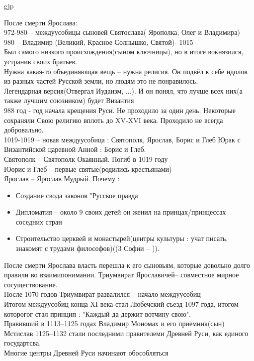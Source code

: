 gjp	 \documentclass[12pt,a4paper]{article}
\begin{document}
После смерти Ярослава:\\
972-980 -- междуусобицы сыновей Святослава( Ярополка, Олег и Владимира)\\
980 -- Владимир (Великий, Красное Солнышко, Святой)- 1015\\
Был самого низкого происхождения(сыном ключницы), но в итоге вокнязился, устранив своих братьев.\\
Нужна какая-то объединяющая вещь -- нужна религия. Он подвёл к себе идолов из разных частей Русской земли, но людям это не понравилось.\\
Легендарная версия(Отвергал Иудаизм, ...). И он понял, что лучше всех них(а также лучшим союзником) будет Византия\\
988 год - год начала крещения Руси. Не проходило за один день. Некоторые сохраняли Свою религию вплоть до XV-XVI века. Проходило не всегда добровально.\\
1019-1019 -- новая междуусобица : Святополк, Ярослав, Борис и Глеб
Юрак с Византийской царевной Анной : Борис и Глеб.\\
Святополк -- Святополк Окаянный. Погиб в 1019 году \\
Юорис и Глеб -- первые святые(родились крестьянами)\\
Ярослав -- Ярослав Мудрый. Почему :
\begin{itemize}
	\item Создание свода законов "Русское правда
	\item Дипломатия -- около 9 своих детей он женил на принцах/принцессах соседних стран
	\item Строительство церквей и монастырей(центры культуры : учат писать, знакомят с  трудами философов)((3 Софии -- )).
\end{itemize}
После смерти Ярослава власть перешла к его сыновьям, которые довольно долго правили во взаимипонимании. Триумвират Ярославичей-- совместное мирное сосуществование.\\
После 1070 годов Триумвират развалился -- начало междуусобиц\\
Итогом междуусобиц конца XI века стал Любечский съезд 1097 года, итогом которогог стал принцип : "Каждый да держит вотчину свою".\\
Правивший в 1113--1125 годах Владимир Мономах и его приемник(сын)\\ Мстислав 1125--1132 стали последними правителеми Древней Руси, как единого государтсва.\\
Многие центры Древней Руси начинают обособляться\\
\end{document}
